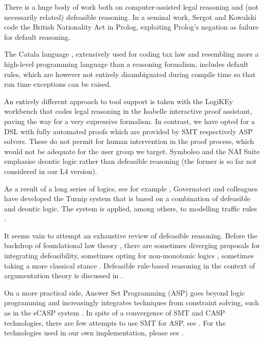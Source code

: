 There is a huge body of work both on computer-assisted legal reasoning and
(not necessarily related) defeasible reasoning. In a seminal work, Sergot and Kowalski
\citep{sergot_kowalski_etal__british_nationality_acm_1986,kowalski_legislation_logic_programs_1995}
code the British Nationality Act in Prolog, exploiting Prolog's negation as
failure for default reasoning.



The Catala language \citep{merigoux_chataing_protzenko_cata_icfp_2021},
extensively used for coding tax law and resembling more a high-level
programming language than a reasoning formalism, includes default rules, which
are however not entirely disambiguated during compile time so that run time
exceptions can be raised.

An entirely different approach to tool support is taken with the LogiKEy \citep{benzmueller_etal_logikey_2020}
workbench that codes legal reasoning in the Isabelle interactive proof assistant, paving
the way for a very expressive formalism. In contrast, we have opted for a DSL
with fully automated proofs which are provided by SMT respectively ASP solvers. These do not permit for human intervention in the proof process, which would not be adequate for the user group we target. Symboleo
\citep{sharifi_parvizimosaed_amyot_logrippo_mylopoulos_Symboleo_spec_legal_contracts_2020}
and the NAI Suite
\citep{libal_steen_nai_suite_draft_reason_legal_texts_jurix_2019} emphasise
deontic logic rather than defeasible reasoning (the former is so far not
considered in our L4 version).

As a result of a long series of logics, see for example
\citep{governatori_carnead_defeas_logic_icail_2011,governatori21:_unrav_legal_refer_defeas_deont_logic},
Governatori and colleagues have developed the Turnip system
that is based on a
combination of defeasible and deontic logic. The system is applied, among
others, to modelling traffic rules
\citep{governatori_Traffic_Rules_Encoding_using_Defeasible_jurix_2020}.

It seems vain to attempt an exhaustive
review of defeasible reasoning. Before the backdrop of foundational law
theory \citep{hart_concept_of_law_1997}, there are sometimes diverging
proposals for integrating defeasibility, sometimes opting for non-monotonic
logics \citep{hage_law_and_defeasibility_2003}, sometimes taking a more
classical stance \citep{alchourron_makinson_hierarchies_of_regulations_1981}. 
Defeasible rule-based reasoning in the context of argumentation theory is
discussed in \citep{dung_argumentation_theory_1995,amgoud_besnard_rule_based_argumentation_systems_2019}.

On a more practical side, Answer Set Programming (ASP) \citep{asp_background}
goes beyond logic programming and increasingly integrates techniques from
constraint solving, such as in the sCASP system
\citep{arias_phd_2019}. In spite of a convergence of SMT and CASP technologies,
there are few attempts to use SMT for ASP, see
\citep{shen_lierler_smt_answer_set_kr_2018}. For the technologies used in our
own implementation, please see . 



